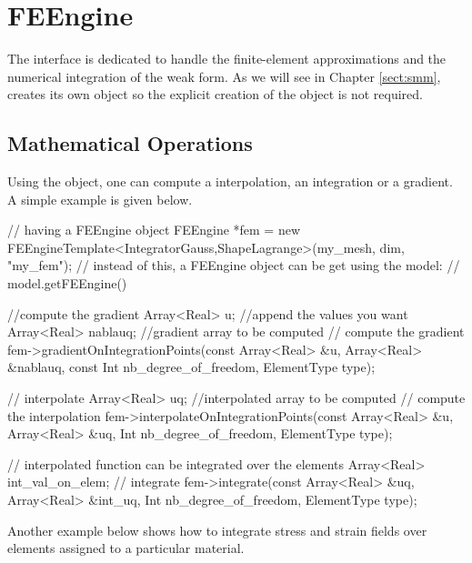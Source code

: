 \chapter{FEEngine}
\label{chap:feengine}
The  interface is dedicated to handle the
finite-element approximations and the numerical integration of the
weak form. As we will see in Chapter \ref{sect:smm}, 
creates its own  object so the explicit creation of the
object is not required.

\section{Mathematical Operations\label{sect:fe:mathop}}
Using the  object, one can compute a interpolation, an
integration or a gradient. A simple example is given below.

\begin{cpp}
// having a FEEngine object
FEEngine *fem = new FEEngineTemplate<IntegratorGauss,ShapeLagrange>(my_mesh, 
                                                                    dim, 
                                                                    "my_fem");
// instead of this, a FEEngine object can be get using the model: 
// model.getFEEngine()

//compute the gradient
Array<Real> u; //append the values you want
Array<Real> nablauq; //gradient array to be computed
// compute the gradient
fem->gradientOnIntegrationPoints(const Array<Real> &u,
				 Array<Real> &nablauq,
				 const Int nb_degree_of_freedom,
				 ElementType type);

// interpolate
Array<Real> uq; //interpolated array to be computed
// compute the interpolation
fem->interpolateOnIntegrationPoints(const Array<Real> &u,
                                    Array<Real> &uq,
                                    Int nb_degree_of_freedom,
                                    ElementType type);

// interpolated function can be integrated over the elements
Array<Real> int_val_on_elem;
// integrate
fem->integrate(const Array<Real> &uq, 
               Array<Real> &int_uq, 
               Int nb_degree_of_freedom,
               ElementType type);
\end{cpp}

Another example below shows how to integrate stress and strain fields
over elements assigned to a particular material.

